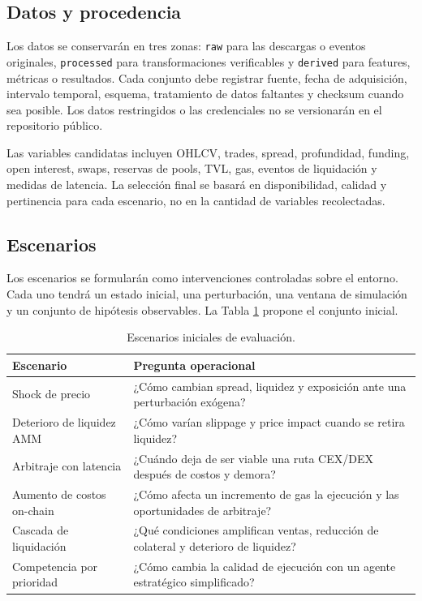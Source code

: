 \subsection{Datos y procedencia}

Los datos se conservarán en tres zonas: \texttt{raw} para las descargas o eventos originales, \texttt{processed} para transformaciones verificables y \texttt{derived} para features, métricas o resultados. Cada conjunto debe registrar fuente, fecha de adquisición, intervalo temporal, esquema, tratamiento de datos faltantes y checksum cuando sea posible. Los datos restringidos o las credenciales no se versionarán en el repositorio público.

Las variables candidatas incluyen OHLCV, trades, spread, profundidad, funding, open interest, swaps, reservas de pools, TVL, gas, eventos de liquidación y medidas de latencia. La selección final se basará en disponibilidad, calidad y pertinencia para cada escenario, no en la cantidad de variables recolectadas.

\subsection{Escenarios}

Los escenarios se formularán como intervenciones controladas sobre el entorno. Cada uno tendrá un estado inicial, una perturbación, una ventana de simulación y un conjunto de hipótesis observables. La Tabla \ref{tab:scenarios} propone el conjunto inicial.

\begin{table}[H]
\centering
\caption{Escenarios iniciales de evaluación.}
\label{tab:scenarios}
\begin{tabularx}{\textwidth}{p{3.7cm}X}
\toprule
\textbf{Escenario} & \textbf{Pregunta operacional} \\
\midrule
Shock de precio & ¿Cómo cambian spread, liquidez y exposición ante una perturbación exógena? \\
Deterioro de liquidez AMM & ¿Cómo varían slippage y price impact cuando se retira liquidez? \\
Arbitraje con latencia & ¿Cuándo deja de ser viable una ruta CEX/DEX después de costos y demora? \\
Aumento de costos on-chain & ¿Cómo afecta un incremento de gas la ejecución y las oportunidades de arbitraje? \\
Cascada de liquidación & ¿Qué condiciones amplifican ventas, reducción de colateral y deterioro de liquidez? \\
Competencia por prioridad & ¿Cómo cambia la calidad de ejecución con un agente estratégico simplificado? \\
\bottomrule
\end{tabularx}
\end{table}

